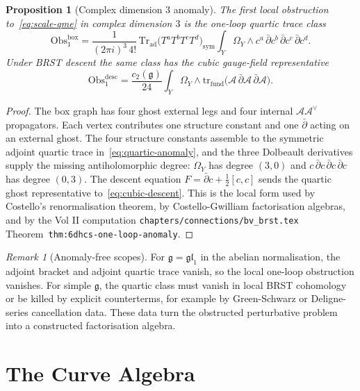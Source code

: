 \documentclass[11pt]{article}
\newtheorem{proposition}[theorem]{Proposition}
\theoremstyle{remark}
\newtheorem{remark}[theorem]{Remark}
\providecommand{\frakg}{\mathfrak{g}}
\providecommand{\fgl}{\mathfrak{gl}}
\providecommand{\dbar}{\bar{\partial}}
\begin{document}
\begin{proposition}[Complex dimension $3$ anomaly]
\label{prop:quartic-anomaly}
The first local obstruction to~\eqref{eq:scale-qme} in complex
dimension $3$ is the one-loop quartic trace class
\[
  \mathrm{Obs}_1^{\mathrm{box}}
  =
  \frac{1}{(2\pi i)^3\,4!}\,
  \mathrm{Tr}_{\mathrm{ad}}
  \bigl(T^aT^bT^cT^d\bigr)_{\mathrm{sym}}
  \int_Y
    \Omega_Y\wedge
    c^a\,\dbar c^b\,\dbar c^c\,\dbar c^d .
  \label{eq:quartic-anomaly}
\]
Under BRST descent the same class has the cubic gauge-field
representative
\[
  \mathrm{Obs}_1^{\mathrm{desc}}
  =
  \frac{c_2(\frakg)}{24}
  \int_Y
    \Omega_Y\wedge
    \mathrm{tr}_{\mathrm{fund}}
    \bigl(\mathcal A\,\dbar\mathcal A\,\dbar\mathcal A\bigr).
  \label{eq:cubic-descent}
\]
\end{proposition}

\begin{proof}
The box graph has four ghost external legs and four internal
$\mathcal A\mathcal A^\vee$ propagators.  Each vertex contributes one
structure constant and one $\dbar$ acting on an external ghost.  The
four structure constants assemble to the symmetric adjoint quartic
trace in~\eqref{eq:quartic-anomaly}, and the three Dolbeault
derivatives supply the missing antiholomorphic degree:
$\Omega_Y$ has degree $(3,0)$ and
$c\,\dbar c\,\dbar c\,\dbar c$ has degree $(0,3)$.  The descent
equation $F=\dbar c+\frac12[c,c]$ sends the quartic ghost
representative to~\eqref{eq:cubic-descent}.  This is the local form
used by Costello's renormalisation theorem, by Costello-Gwilliam
factorisation algebras, and by the Vol II computation
\texttt{chapters/connections/bv\_brst.tex}
Theorem~\texttt{thm:6dhcs-one-loop-anomaly}.
\end{proof}

\begin{remark}[Anomaly-free scopes]
\label{rem:anomaly-free-scopes}
For $\frakg=\fgl_1$ in the abelian normalisation, the adjoint bracket
and adjoint quartic trace vanish, so the local one-loop obstruction
vanishes.  For simple $\frakg$, the quartic class must vanish in local
BRST cohomology or be killed by explicit counterterms, for example by
Green-Schwarz or Deligne-series cancellation data.  These data turn the
obstructed perturbative problem into a constructed factorisation
algebra.
\end{remark}

\section{The Curve Algebra}
\end{document}
